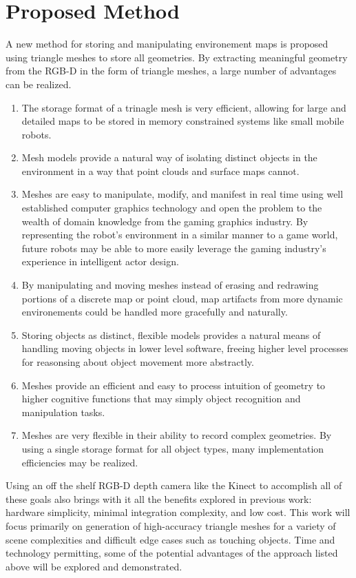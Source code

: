 \documentclass[english]{article}
\begin{document}
\section*{Proposed Method}
A new method for storing and manipulating environement maps is proposed using triangle meshes to store all geometries. By extracting meaningful geometry from the RGB-D in the form of triangle meshes, a large number of advantages can be realized.
\begin{enumerate}
\item The storage format of a trinagle mesh is very efficient, allowing for large and detailed maps to be stored in memory constrained systems like small mobile robots. 
\item Mesh models provide a natural way of isolating distinct objects in the environment in a way that point clouds and surface maps cannot. 
\item Meshes are easy to manipulate, modify, and manifest in real time using well established computer graphics technology and open the problem to the wealth of domain knowledge from the gaming graphics industry. By representing the robot's environment in a similar manner to a game world, future robots may be able to more easily leverage the gaming industry's experience in intelligent actor design. 
\item By manipulating and moving meshes instead of erasing and redrawing portions of a discrete map or point cloud, map artifacts from more dynamic environements could be handled more gracefully and naturally.
\item Storing objects as distinct, flexible models provides a natural means of handling moving objects in lower level software, freeing higher level processes for reasonsing about object movement more abstractly.
\item Meshes provide an efficient and easy to process intuition of geometry to higher cognitive functions that may simply object recognition and manipulation tasks.
\item Meshes are very flexible in their ability to record complex geometries. By using a single storage format for all object types, many implementation efficiencies may be realized.
\end{enumerate}
Using an off the shelf RGB-D depth camera like the Kinect to accomplish all of these goals also brings with it all the benefits explored in previous work: hardware simplicity, minimal integration complexity, and low cost. This work will focus primarily on generation of high-accuracy triangle meshes for a variety of scene complexities and difficult edge cases such as touching objects. Time and technology permitting, some of the potential advantages of the approach listed above will be explored and demonstrated.


\end{document}
